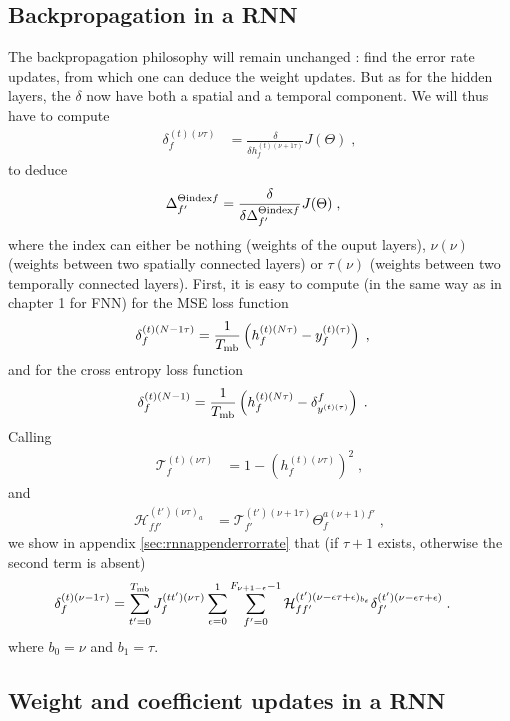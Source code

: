 \subsection{Backpropagation in a RNN}

The backpropagation philosophy will remain unchanged : find the error rate updates, from which one can deduce the weight updates. But as for the hidden layers, the $\delta$ now have both a spatial and a temporal component. We will thus have to compute 
\begin{align}
\delta^{(t)( \nu\tau)}_f&=\frac{\delta}{\delta h^{(t)( \nu+1\tau)}_f }J(\Theta)\;,
\end{align}
to deduce
\begin{align}
\Delta^{\Theta{\rm index}f}_{f'}&=\frac{\delta}{\delta \Delta^{\Theta{\rm index}f}_{f'} }J(\Theta)\;,
\end{align}
where the index can either be nothing (weights of the ouput layers), $\nu(\nu)$ (weights between two spatially connected layers) or  $\tau(\nu)$ (weights between two temporally connected layers). First, it is easy to compute (in the same way as in chapter 1 for FNN) for the MSE loss function
\begin{align}
\delta^{(t)(N-1\tau)}_f&= \frac{1}{T_{{\rm mb}}}\left(h_{f}^{(t)(N\tau)}-y_f^{(t)(\tau)}\right)\;,
\end{align}
and for the cross entropy loss function
\begin{align}
\delta^{(t)(N-1)}_{f}&= \frac{1}{T_{{\rm mb}}}\left(h_{f}^{(t)(N\tau)}-\delta^f_{y^{(t)(\tau)}}\right)\;.
\end{align}
Calling 
\begin{align}
\mathcal{T}_{f}^{(t)(\nu\tau)}&=1-\left(h_{f}^{(t)(\nu\tau)}\right)^2\;,
\end{align}
and
\begin{align}
\mathcal{H}^{(t')(\nu\tau)_a}_{ff'}&=\mathcal{T}^{(t')(\nu+1\tau)}_{f'}\Theta^{a(\nu+1)f'}_{f}\;,
\end{align}
we show in appendix \ref{sec:rnnappenderrorrate} that (if $\tau+1$ exists, otherwise the second term is absent)
\begin{align}
\delta^{(t)(\nu-1\tau)}_f&= 
%
\sum_{t'=0}^{T_{{\rm mb}}}J^{(tt')(\nu\tau)}_f\sum_{\epsilon=0}^{1}\sum_{f'=0}^{F_{\nu+1-\epsilon}-1}
%
\mathcal{H}^{(t')(\nu-\epsilon\tau+\epsilon)_{b_\epsilon}}_{ff'}\delta^{(t')(\nu-\epsilon\tau+\epsilon)}_{f'}\;.
\end{align}
where $b_0=\nu$ and $b_1=\tau$.

\subsection{Weight and coefficient updates in a RNN}

